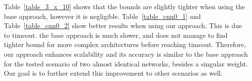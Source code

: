 Table~\ref{table_3_x_10} shows that the bounds are slightly tighter when using the base approach, however it is negligible. Table~\ref{table_cnn0_1} and Table~\ref{table_cnn0_2} show better results when using our approach. This is due to timeout. the base approach is much slower, and does not manage to find tighter bound for more complex architectures before reaching timeout. Therefore, our approach enhances scalability and its accuracy is similar to the base approach for the tested scenario of two almost identical networks, besides a singular weight. Our goal is to further extend this improvement to other scenarios as well. 

\begin{table}[H]
	\centering
\caption{The lower and upper bounds for 3X10 architecture 
		\label{table_3_x_10}}
\end{table}


